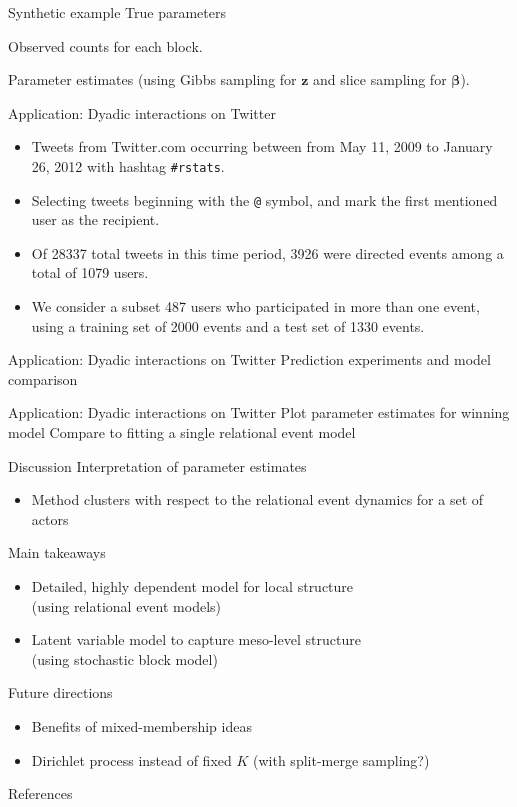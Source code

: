 \documentclass{beamer}
\begin{document}
\begin{frame}{Synthetic example}
True parameters

Observed counts for each block.

Parameter estimates (using Gibbs sampling for $\mathbf{z}$ and slice sampling for $\boldsymbol{\beta}$).
\end{frame}

\begin{frame}{Application: Dyadic interactions on Twitter}
  \begin{itemize}
  \item Tweets from Twitter.com occurring between from May 11, 2009 to January 26, 2012 with hashtag \texttt{\#rstats}.
  \item Selecting tweets beginning with the \texttt{@} symbol, and mark the first mentioned user as the recipient.
  \item Of 28337 total tweets in this time period, 3926 were directed events among a total of 1079 users.
  \item We consider a subset 487 users who participated in more than one event, using a training set of 2000 events and a test set of 1330 events.
  \end{itemize}
\end{frame}

\begin{frame}{Application: Dyadic interactions on Twitter}
Prediction experiments and model comparison
\end{frame}

\begin{frame}{Application: Dyadic interactions on Twitter}
Plot parameter estimates for winning model
Compare to fitting a single relational event model
\end{frame}

\begin{frame}{Discussion}
Interpretation of parameter estimates
  \begin{itemize}
  \item Method clusters with respect to the relational event dynamics for a set of actors
  \end{itemize}

Main takeaways
\begin{itemize}
\item Detailed, highly dependent model for local structure\\ (using relational event models)
\item Latent variable model to capture meso-level structure \\(using stochastic block model)
\end{itemize}
\end{frame}

\begin{frame}{Future directions}
  \begin{itemize}
  \item Benefits of mixed-membership ideas
  \item Dirichlet process instead of fixed $K$ (with split-merge sampling?)
  \end{itemize}
\end{frame}

\begin{frame}{References}
  
\end{frame}
\end{document}
